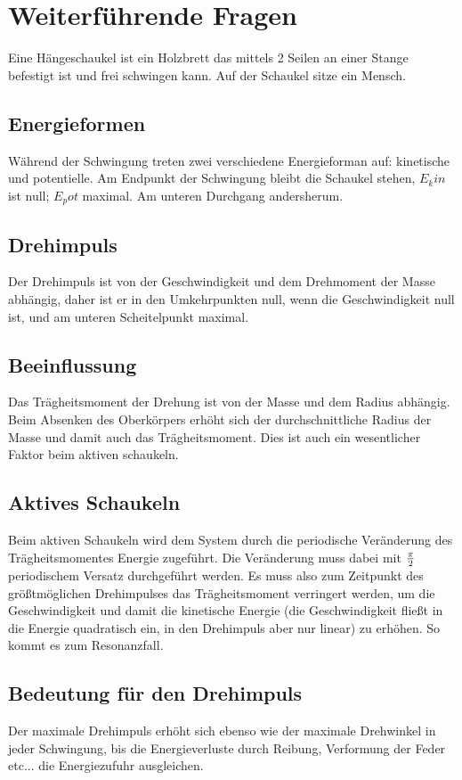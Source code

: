 


\section{Weiterführende Fragen}

Eine Hängeschaukel ist ein Holzbrett das mittels 2 Seilen an einer Stange befestigt ist und frei schwingen kann.
Auf der Schaukel sitze ein Mensch.

\subsection{Energieformen}

Während der Schwingung treten zwei verschiedene Energieforman auf: kinetische und potentielle.
Am Endpunkt der Schwingung bleibt die Schaukel stehen, $E_kin$ ist null; $E_pot$ maximal.
Am unteren Durchgang andersherum.

\subsection{Drehimpuls}

Der Drehimpuls ist von der Geschwindigkeit und dem Drehmoment der Masse abhängig, daher ist er in den Umkehrpunkten null, wenn die Geschwindigkeit null ist, und am unteren Scheitelpunkt maximal.

\subsection{Beeinflussung}

Das Trägheitsmoment der Drehung ist von der Masse und dem Radius abhängig. Beim Absenken des Oberkörpers erhöht sich der durchschnittliche Radius der Masse und damit auch das Trägheitsmoment.
Dies ist auch ein wesentlicher Faktor beim aktiven schaukeln.

\subsection{Aktives Schaukeln}

Beim aktiven Schaukeln wird dem System durch die periodische Veränderung des Träg\-heits\-mo\-men\-tes Energie zugeführt.
Die Veränderung muss dabei mit $\pi \over 2$ periodischem Versatz durchgeführt werden.
Es muss also zum Zeitpunkt des größtmöglichen Drehimpulses das Träg\-heits\-mo\-men\-t verringert werden, um die Geschwindigkeit und damit die kinetische Energie (die Geschwindigkeit fließt in die Energie quadratisch ein, in den Drehimpuls aber nur linear) zu erhöhen.
So kommt es zum Resonanzfall.

\subsection{Bedeutung für den Drehimpuls}

Der maximale Drehimpuls erhöht sich ebenso wie der maximale Drehwinkel in jeder Schwingung, bis die Energieverluste durch Reibung, Verformung der Feder etc... die Energiezufuhr ausgleichen.
